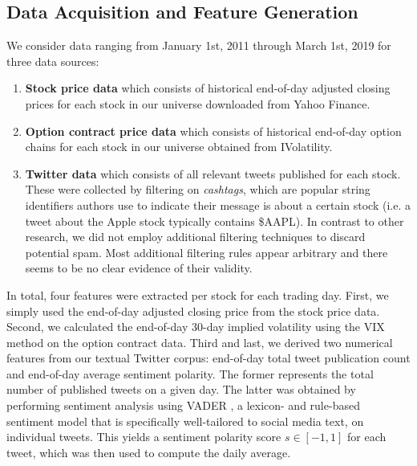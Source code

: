 \documentclass[preprint,1p, times,authoryear]{elsarticle}
\begin{document}
\subsection{Data Acquisition and Feature Generation}
\label{meth:feats}

We consider data ranging from January 1st, 2011 through March 1st, 2019 for three data sources:
\begin{enumerate}[noitemsep]
\item \textbf{Stock price data}  which consists of historical end-of-day adjusted closing prices for each stock in our universe downloaded from Yahoo Finance.
\item \textbf{Option contract price data} which consists of historical end-of-day option chains for each stock in our universe obtained from IVolatility.
\item \textbf{Twitter data} which consists of all relevant tweets published for each stock. These were collected by filtering on \textit{cashtags}, which are popular string identifiers authors use to indicate their message is about a certain stock (i.e. a tweet about the Apple stock typically contains \$AAPL). In contrast to other research, we did not employ additional filtering techniques to discard potential spam. Most additional filtering rules appear arbitrary and there seems to be no clear evidence of their validity. 
\end{enumerate}

In total, four features were extracted per stock for each trading day. First, we simply used the end-of-day adjusted closing price from the stock price data. Second, we calculated the end-of-day 30-day implied volatility using the VIX method on the option contract data. Third and last, we derived two numerical features from our textual Twitter corpus: end-of-day total tweet publication count and end-of-day average sentiment polarity. The former represents the total number of published tweets on a given day. The latter was obtained by performing sentiment analysis using VADER \citep{vader}, a lexicon- and rule-based sentiment model that is specifically well-tailored to social media text, on individual tweets. This yields a sentiment polarity score $s \in [-1, 1]$ for each tweet, which was then used to compute the daily average. 
\end{document}
